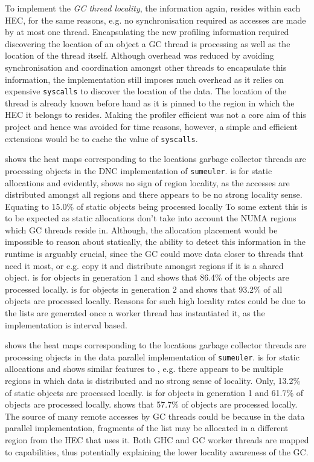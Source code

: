 \documentclass{paper}\usepackage{graphicx}
\begin{document}
To implement the \textit{GC thread locality}, the information again, resides within each HEC, for the same reasons, e.g. no synchronisation required as accesses are made by at most one thread. Encapsulating the new profiling information required discovering the location of an object a GC thread is processing as well as the location of the thread itself. Although overhead was reduced by avoiding synchronisation and coordination amongst other threads to encapsulate this information, the implementation still imposes much overhead as it relies on expensive \lstinline{syscalls} to discover the location of the data. The location of the thread is already known before hand as it is pinned to the region in which the HEC it belongs to resides. Making the profiler efficient was not a core aim of this project and hence was avoided for time reasons, however, a simple and efficient extensions would be to cache the value of \lstinline{syscalls}.

 shows the heat maps corresponding to the locations garbage collector threads are processing objects in the DNC implementation of \lstinline{sumeuler}.  is for static allocations and evidently, shows no sign of region locality, as the accesses are distributed amongst all regions and there appears to be no strong locality sense. Equating to 15.0\% of static objects being processed locally To some extent this is to be expected as static allocations don't take into account the NUMA regions which GC threads reside in. Although, the allocation placement would be impossible to reason about statically, the ability to detect this information in the runtime is arguably crucial, since the GC could move data closer to threads that need it most, or e.g. copy it and distribute amongst regions if it is a shared object.  is for objects in generation 1 and shows that 86.4\% of the objects are processed locally.  is for objects in generation 2 and shows that 93.2\% of all objects are processed locally. Reasons for such high locality rates could be due to the lists are generated once a worker thread has instantiated it, as the implementation is interval based.

 shows the heat maps corresponding to the locations garbage collector threads are processing objects in the data parallel implementation of \lstinline{sumeuler}.  is for static allocations and shows similar features to , e.g. there appears to be multiple regions in which data is distributed and no strong sense of locality. Only, 13.2\% of static objects are processed locally.  is for objects in generation 1 and 61.7\% of objects are processed locally.  shows that 57.7\% of objects are processed locally. The source of many remote accesses by GC threads could be because in the data parallel implementation, fragments of the list may be allocated in a different region from the HEC that uses it. Both GHC and GC worker threads are mapped to capabilities, thus potentially explaining the lower locality awareness of the GC.
\end{document}
